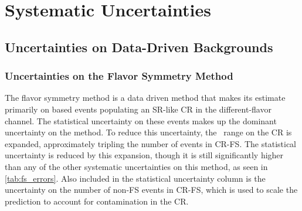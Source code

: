 
\chapter{Systematic Uncertainties} %

\label{ch:background_uncertainties} 

\section{Uncertainties on Data-Driven Backgrounds}

\subsection{Uncertainties on the Flavor Symmetry Method}
\label{sec:unc_fs}

The flavor symmetry method is a data driven method that makes its estimate primarily on based events populating an \ac{SR}-like \ac{CR} in the different-flavor channel. The statistical uncertainty on these events makes up the dominant uncertainty on the method. To reduce this uncertainty, the \mll~range on the \ac{CR} is expanded, approximately tripling the number of events in CR-FS. The statistical uncertainty is reduced by this expansion, though it is still significantly higher than any of the other systematic uncertainties on this method, as seen in \autoref{tab:fs_errors}. Also included in the statistical uncertainty column is the uncertainty on the number of non-\ac{FS} events in CR-FS, which is used to scale the prediction to account for contamination in the \ac{CR}. 

